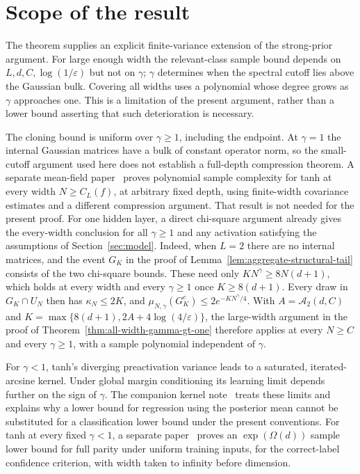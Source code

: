 \documentclass[11pt]{article}
\theoremstyle{definition}
\begin{document}





\section{Scope of the result}
The theorem supplies an explicit finite-variance extension of the strong-prior argument. For large enough width the relevant-class sample bound depends on $L,d,C,\log(1/\varepsilon)$ but not on $\gamma$; $\gamma$ determines when the spectral cutoff lies above the Gaussian bulk. Covering all widths uses a polynomial whose degree grows as $\gamma$ approaches one. This is a limitation of the present argument, rather than a lower bound asserting that such deterioration is necessary.

The cloning bound is uniform over $\gamma\geq1$, including the endpoint.
At $\gamma=1$ the internal Gaussian matrices have a bulk of constant
operator norm, so the small-cutoff argument used here does not establish a
full-depth compression theorem. A separate mean-field paper~\cite{critical}
proves polynomial sample complexity for tanh at every width
$N\geq C_L(f)$, at arbitrary fixed depth, using finite-width covariance
estimates and a different compression argument. That result is not needed
for the present proof. For one hidden layer, a direct chi-square argument
already gives the every-width conclusion for all $\gamma\geq1$ and any
activation satisfying the assumptions of Section~\ref{sec:model}. Indeed, when
$L=2$ there are no internal matrices, and the event $G_K$ in the proof of
Lemma~\ref{lem:aggregate-structural-tail} consists of the two chi-square
bounds. These need only $KN^\gamma\geq8N(d+1)$, which holds at every width
and every $\gamma\geq1$ once $K\geq8(d+1)$. Every draw in $G_K\cap U_N$ then
has $\kappa_N\leq2K$, and $\mu_{N,\gamma}(G_K^c)\leq2e^{-KN^\gamma/4}$.
With $A=\mathcal A_2(d,C)$ and $K=\max\{8(d+1),2A+4\log(4/\varepsilon)\}$,
the large-width argument in the proof of
Theorem~\ref{thm:all-width-gamma-gt-one} therefore applies at every $N\geq C$
and every $\gamma\geq1$, with a sample polynomial independent of $\gamma$.

For $\gamma<1$, tanh's diverging preactivation variance leads to a saturated, iterated-arcsine kernel. Under global margin conditioning its learning limit depends further on the sign of $\gamma$. The companion kernel note~\cite{subcritical} treats these limits and explains why a lower bound for regression using the posterior mean cannot be substituted for a classification lower bound under the present conventions. For tanh at every fixed $\gamma<1$, a separate paper~\cite{subexp} proves an $\exp(\Omega(d))$ sample lower bound for full parity under uniform training inputs, for the correct-label confidence criterion, with width taken to infinity before dimension.
\end{document}
